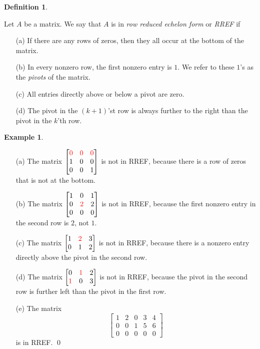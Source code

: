 \documentclass[a4paper]{book}
\newcommand{\RED}[1]{{\color{red}#1}}
\newcommand{\PURPLE}[1]{{\color{purple}#1}}
\newcommand{\bbm}       {\begin{bmatrix}}
\newcommand{\ebm}       {\end{bmatrix}}
\renewcommand{\:}{\colon}
\newcommand{\bilabel}[1]{\hypertarget{#1}{\label{#1}}}
\newcommand{\DEFN}[1]{\PURPLE{\emph{#1}}}
\theoremstyle{definition}
\newtheorem{definition}[theorem]{Definition}
\newtheorem{example}[theorem]{Example}
\begin{document}
\begin{definition}\bilabel{defn-rref}
 Let $A$ be a matrix.  We say that $A$ is in \DEFN{row reduced echelon
 form} or \DEFN{RREF} if
 \begin{itemize}
  \item[(a)] If there are any rows of zeros, then they all occur at
   the bottom of the matrix.
  \item[(b)] In every nonzero row, the first nonzero entry is $1$.  We
   refer to these $1$'s as the \DEFN{pivots} of the matrix.
  \item[(c)] All entries directly above or below a pivot are zero.
  \item[(d)] The pivot in the $(k+1)$'st row is always
   further to the right than the pivot in the $k$'th row.
 \end{itemize}
\end{definition}
\begin{example}\bilabel{eg-rref}
 \begin{itemize}
  \item[(a)] The matrix
   {\small $\bbm \RED{0}&\RED{0}&\RED{0} \\ 1&0&0 \\ 0&0&1\ebm$}
   is not in RREF, because there is a row of zeros that is not at the
   bottom. 
  \item[(b)] The matrix
   {\small $\bbm 1&0&1 \\ 0&\RED{2}&2 \\ 0&0&0\ebm$}
   is not in RREF, because the first nonzero entry in the second row
   is $2$, not $1$.
  \item[(c)] The matrix
   {\small $\bbm 1&\RED{2}&3 \\ 0&1&2 \ebm$}
   is not in RREF, because there is a nonzero entry directly above the
   pivot in the second row.
  \item[(d)] The matrix
   {\small $\bbm 0&\RED{1}&2 \\ \RED{1}&0&3 \ebm$}
   is not in RREF, because the pivot in the second row is further left
   than the pivot in the first row.
  \item[(e)] The matrix
   {\small \[ \bbm 1&2&0&3&4 \\ 0&0&1&5&6 \\ 0&0&0&0&0 \ebm \]}
   is in RREF. \qed
 \end{itemize}
\end{example}
\end{document}
